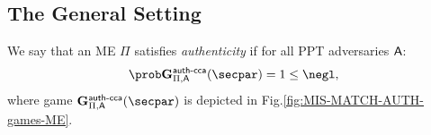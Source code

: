\subsection{The General Setting}
\begin{definition}[Authenticity of ME]\label{def:DNISHeufsecurity}
    We say that an ME $\Pi$ satisfies {\em authenticity} if for all PPT adversaries $\mathsf{A}$:
    \[
        \Prob{\NISHeufgamecca{}_{\Pi, \adversary}(\secpar) = 1} \leq \negl,
    \]
    where game $\NISHeufgamecca{}_{\Pi, \adversary}(\secpar)$ is depicted in Fig.\ref{fig:MIS-MATCH-AUTH-games-ME}.
\end{definition}